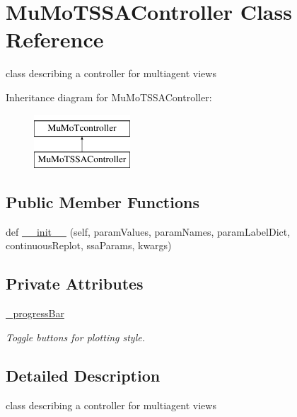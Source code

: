\hypertarget{class_mu_mo_t_1_1_mu_mo_t_1_1_mu_mo_t_s_s_a_controller}{}\section{Mu\+Mo\+T\+S\+S\+A\+Controller Class Reference}
\label{class_mu_mo_t_1_1_mu_mo_t_1_1_mu_mo_t_s_s_a_controller}


class describing a controller for multiagent views  


Inheritance diagram for Mu\+Mo\+T\+S\+S\+A\+Controller\+:\begin{figure}[H]
\begin{center}
\leavevmode
\includegraphics[height=2.000000cm]{class_mu_mo_t_1_1_mu_mo_t_1_1_mu_mo_t_s_s_a_controller}
\end{center}
\end{figure}
\subsection*{Public Member Functions}
\begin{DoxyCompactItemize}
\item 
def \hyperlink{class_mu_mo_t_1_1_mu_mo_t_1_1_mu_mo_t_s_s_a_controller_aca0478525092b12bd60e9ee971100a57}{\+\_\+\+\_\+init\+\_\+\+\_\+} (self, param\+Values, param\+Names, param\+Label\+Dict, continuous\+Replot, ssa\+Params, kwargs)
\end{DoxyCompactItemize}
\subsection*{Private Attributes}
\begin{DoxyCompactItemize}
\item 
\hyperlink{class_mu_mo_t_1_1_mu_mo_t_1_1_mu_mo_t_s_s_a_controller_a018864aa22d2adb0d3958fb0adbce8e2}{\+\_\+progress\+Bar}
\begin{DoxyCompactList}\small\item\em Toggle buttons for plotting style. \end{DoxyCompactList}\end{DoxyCompactItemize}


\subsection{Detailed Description}
class describing a controller for multiagent views 

